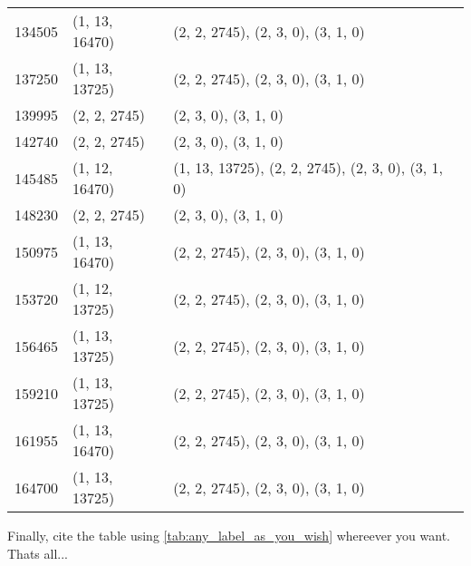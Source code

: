 \begin{center}
\begin{longtable}{|l|l|l|}
		134505 & (1, 13, 16470) & (2, 2, 2745), (2, 3, 0), (3, 1, 0) \\
		137250 & (1, 13, 13725) & (2, 2, 2745), (2, 3, 0), (3, 1, 0) \\
		139995 & (2, 2, 2745) & (2, 3, 0), (3, 1, 0) \\
		142740 & (2, 2, 2745) & (2, 3, 0), (3, 1, 0) \\
		145485 & (1, 12, 16470) & (1, 13, 13725), (2, 2, 2745), (2, 3, 0), (3, 1, 0) \\
		148230 & (2, 2, 2745) & (2, 3, 0), (3, 1, 0) \\
		150975 & (1, 13, 16470) & (2, 2, 2745), (2, 3, 0), (3, 1, 0) \\
		153720 & (1, 12, 13725) & (2, 2, 2745), (2, 3, 0), (3, 1, 0) \\
		156465 & (1, 13, 13725) & (2, 2, 2745), (2, 3, 0), (3, 1, 0) \\
		159210 & (1, 13, 13725) & (2, 2, 2745), (2, 3, 0), (3, 1, 0) \\
		161955 & (1, 13, 16470) & (2, 2, 2745), (2, 3, 0), (3, 1, 0) \\
		164700 & (1, 13, 13725) & (2, 2, 2745), (2, 3, 0), (3, 1, 0) \\
	\end{longtable}
\end{center}



Finally, cite the table using \autoref{tab:any_label_as_you_wish} whereever you want. Thats all...